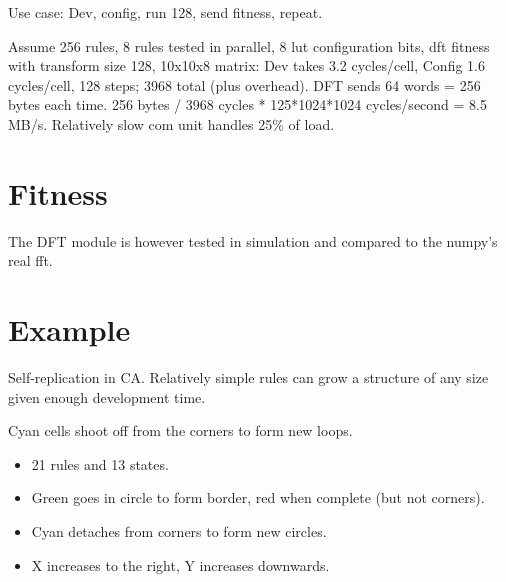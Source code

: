 Use case: Dev, config, run 128, send fitness, repeat.

Assume 256 rules, 8 rules tested in parallel, 8 lut configuration bits, dft fitness with transform size 128, 10x10x8 matrix:
Dev takes 3.2 cycles/cell, Config 1.6 cycles/cell, 128 steps; 3968 total (plus overhead).
DFT sends 64 words = 256 bytes each time.
256 bytes / 3968 cycles * 125*1024*1024 cycles/second = 8.5 MB/s.
Relatively slow com unit handles 25\% of load.

\section{Fitness}

\TODO

The DFT module is however tested in simulation and compared to the numpy's real fft.

\section{Example}

Self-replication in CA.
Relatively simple rules can grow a structure of any size given enough development time.

Cyan cells shoot off from the corners to form new loops.

\begin{itemize}
    \item 21 rules and 13 states.
    \item Green goes in circle to form border, red when complete (but not corners).
    \item Cyan detaches from corners to form new circles.
    \item X increases to the right, Y increases downwards.
\end{itemize}

